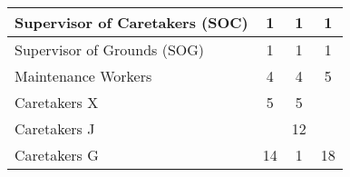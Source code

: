 \begin{tabular}{l|c|c|c|}
        \multicolumn{1}{|l|}{\cellcolor{ccfuschialight}Supervisor of Caretakers (SOC)} & 1                                                      & 1                                                                & 1                                                      \\ \hline
        \multicolumn{1}{|l|}{\cellcolor{ccfuschialight}Supervisor of Grounds (SOG)}    & 1                                                      & 1                                                                & 1                                                      \\ \hline
        \multicolumn{1}{|l|}{\cellcolor{ccfuschialight}Maintenance Workers}            & 4                                                      & 4                                                                & 5                                                       \\ \hline
        \multicolumn{1}{|l|}{\cellcolor{ccfuschialight}Caretakers X}                   & 5                                                      & 5                                                                &                                                       \\ \cline{1-3}
        \multicolumn{1}{|l|}{\cellcolor{ccfuschialight}Caretakers J\tnote{1}}                   &                                                       & 12                                                                &                                                         \\ \cline{1-1} \cline{3-3}
        \multicolumn{1}{|l|}{\cellcolor{ccfuschialight}Caretakers G}                   & \multirow{-2}{*}{14}                                                      & 1                                     & \multirow{-3}{*}{18}                           \\ \hline
        \end{tabular}
        
        
